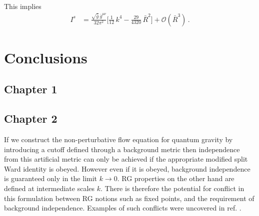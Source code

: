 \documentclass[11pt]{book} %
\numberwithin{equation}{chapter}
\begin{document}
{This implies
\begin{align}
  I^s &= \frac{ \sqrt{\bar g} \, \bar g^{\mu\nu} }{ 32 \pi^2 }
  \bigg[
    \frac{1}{12} \, k^4  - \frac{29}{4320} \, \bar R^2
  \bigg]
  + \mathcal O (\bar R^3) \,.
\end{align}




\chapter*{Conclusions}

\section*{Chapter 1}

\section*{Chapter 2}

If we construct the non-perturbative flow equation for quantum gravity by introducing a cutoff defined through
a background metric then independence from this artificial metric can only be achieved if the appropriate
modified split Ward identity is obeyed. However even if it is obeyed, background independence is guaranteed
only in the limit $k\to0$.
RG properties on the other hand are defined at intermediate scales $k$.
There is therefore the potential for conflict in this formulation between RG notions such as fixed points,
and the requirement of background independence.
Examples of such conflicts were uncovered in ref. \cite{Dietz:2015owa}.

}
\end{document}
